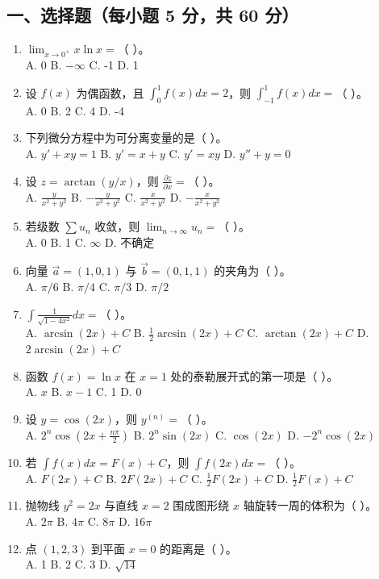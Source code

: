 \documentclass[11pt,a4paper]{article}
\begin{document}
\subsection*{一、选择题（每小题 5 分，共 60 分）}
\begin{enumerate}
    \item $\lim_{x \to 0^+} x \ln x = $（ ）。 \\
    A. 0 \quad B. $-\infty$ \quad C. -1 \quad D. 1
    \item 设 $f(x)$ 为偶函数，且 $\int_0^1 f(x) dx = 2$，则 $\int_{-1}^1 f(x) dx = $（ ）。 \\
    A. 0 \quad B. 2 \quad C. 4 \quad D. -4
    \item 下列微分方程中为可分离变量的是（ ）。 \\
    A. $y' + xy = 1$ \quad B. $y' = x+y$ \quad C. $y' = xy$ \quad D. $y'' + y = 0$
    \item 设 $z = \arctan(y/x)$，则 $\frac{\partial z}{\partial x} = $（ ）。 \\
    A. $\frac{y}{x^2+y^2}$ \quad B. $-\frac{y}{x^2+y^2}$ \quad C. $\frac{x}{x^2+y^2}$ \quad D. $-\frac{x}{x^2+y^2}$
    \item 若级数 $\sum u_n$ 收敛，则 $\lim_{n \to \infty} u_n = $（ ）。 \\
    A. 0 \quad B. 1 \quad C. $\infty$ \quad D. 不确定
    \item 向量 $\vec{a}=(1, 0, 1)$ 与 $\vec{b}=(0, 1, 1)$ 的夹角为（ ）。 \\
    A. $\pi/6$ \quad B. $\pi/4$ \quad C. $\pi/3$ \quad D. $\pi/2$
    \item $\int \frac{1}{\sqrt{1-4x^2}} dx = $（ ）。 \\
    A. $\arcsin(2x) + C$ \quad B. $\frac{1}{2}\arcsin(2x) + C$ \quad C. $\arctan(2x) + C$ \quad D. $2\arcsin(2x) + C$
    \item 函数 $f(x) = \ln x$ 在 $x=1$ 处的泰勒展开式的第一项是（ ）。 \\
    A. $x$ \quad B. $x-1$ \quad C. 1 \quad D. 0
    \item 设 $y = \cos(2x)$，则 $y^{(n)} = $（ ）。 \\
    A. $2^n \cos(2x + \frac{n\pi}{2})$ \quad B. $2^n \sin(2x)$ \quad C. $\cos(2x)$ \quad D. $-2^n \cos(2x)$
    \item 若 $\int f(x) dx = F(x) + C$，则 $\int f(2x) dx = $（ ）。 \\
    A. $F(2x) + C$ \quad B. $2F(2x) + C$ \quad C. $\frac{1}{2}F(2x) + C$ \quad D. $\frac{1}{2}F(x) + C$
    \item 抛物线 $y^2 = 2x$ 与直线 $x=2$ 围成图形绕 $x$ 轴旋转一周的体积为（ ）。 \\
    A. $2\pi$ \quad B. $4\pi$ \quad C. $8\pi$ \quad D. $16\pi$
    \item 点 $(1, 2, 3)$ 到平面 $x=0$ 的距离是（ ）。 \\
    A. 1 \quad B. 2 \quad C. 3 \quad D. $\sqrt{14}$
\end{enumerate}
\end{document}
